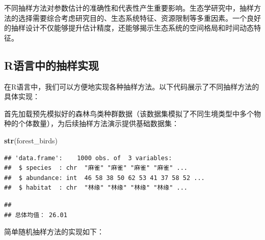 \documentclass[
  twoside,12pt,fontset=none]{ctexbook}
\newenvironment{Shaded}{\begin{snugshade}}{\end{snugshade}}
\newcommand{\FunctionTok}[1]{\textcolor[rgb]{0.13,0.29,0.53}{\textbf{#1}}}
\newcommand{\NormalTok}[1]{#1}
\newcommand{\SpecialCharTok}[1]{\textcolor[rgb]{0.81,0.36,0.00}{\textbf{#1}}}
\newcommand{\StringTok}[1]{\textcolor[rgb]{0.31,0.60,0.02}{#1}}
\begin{document}
不同抽样方法对参数估计的准确性和代表性产生重要影响。生态学研究中，抽样方法的选择需要综合考虑研究目的、生态系统特征、资源限制等多重因素。一个良好的抽样设计不仅能够提升估计精度，还能够揭示生态系统的空间格局和时间动态特征。

\hypertarget{rux8bedux8a00ux4e2dux7684ux62bdux6837ux5b9eux73b0}{%
\subsection{R语言中的抽样实现}\label{rux8bedux8a00ux4e2dux7684ux62bdux6837ux5b9eux73b0}}

在R语言中，我们可以方便地实现各种抽样方法。以下代码展示了不同抽样方法的具体实现：

首先加载预先模拟好的森林鸟类种群数据（该数据集模拟了不同生境类型中多个物种的个体数量），为后续抽样方法演示提供基础数据集：

\begin{Shaded}
\begin{Highlighting}[]
\FunctionTok{str}\NormalTok{(forest\_birds)}
\end{Highlighting}
\end{Shaded}

\begin{verbatim}
## 'data.frame':    1000 obs. of  3 variables:
##  $ species  : chr  "麻雀" "麻雀" "麻雀" "麻雀" ...
##  $ abundance: int  46 58 38 50 62 53 41 37 58 52 ...
##  $ habitat  : chr  "林缘" "林缘" "林缘" "林缘" ...
\end{verbatim}

\begin{Shaded}
\end{Shaded}

\begin{verbatim}
## 
## 总体均值： 26.01
\end{verbatim}

简单随机抽样方法的实现如下：
\end{document}
